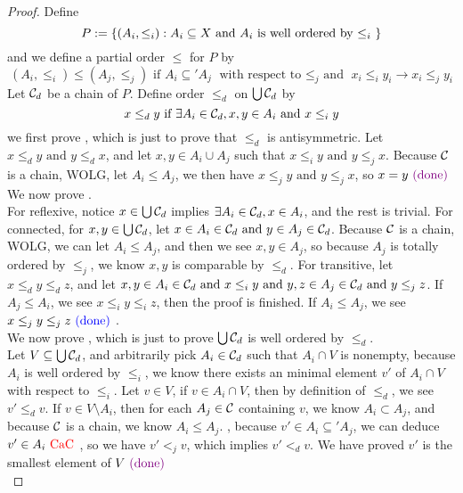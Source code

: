 \documentclass{report}
\begin{document}
\begin{proof}
Define
\begin{equation}
P:=\{ (A_i,\leq_i): A_i\subseteq X\text{ and }A_i\text{ is well ordered by $\leq_i$ } \}
\end{equation}
and we define a partial order $\leq $ for $P$ by
\begin{equation}
  (A_i,\leq_i)\leq (A_j,\leq _j)\text{ if }A_i\subseteq' A_j\text{ with respect to $\leq_j$ and }x_i\leq_i y_i\longrightarrow x_i\leq_j y_i 
\end{equation}
Let $\mathcal{C}_d$ be a chain of $P$. Define order $\leq_d$ on $\bigcup \mathcal{C}_d$ by
\begin{equation}
x\leq_d y\text{ if }\exists A_i\in\mathcal{C}_d, x,y\in A_i\text{ and }x\leq_i y
\end{equation}
we first prove , which is just to prove that $\leq_d$ is antisymmetric. Let $x\leq_d y\text{ and }y\leq _dx$, and let $x,y\in A_i\cup A_j$ such that $x\leq_i y\text{ and }y\leq _jx$. Because $\mathcal{C}$ is a chain, WOLG, let $A_i\leq A_j$, we then have  $x\leq_j y\text{ and }y\leq _jx$, so $x=y\textcolor{violet}{\text{ (done) }}$\\

We now prove  .\\

For reflexive, notice $x\in \bigcup\mathcal{C}_d$ implies $\exists A_i\in\mathcal{C}_d, x \in A_i$, and the rest is trivial. For connected, for $x,y\in \bigcup \mathcal{C}_d$, let $x\in A_i \in\mathcal{C}_d\text{ and }y\in A_j\in\mathcal{C}_d$. Because $\mathcal{C}$ is a chain, WOLG, we can let $A_i\leq A_j$, and then we see $x,y\in A_j$, so because $A_j$ is totally ordered by $\leq_j$, we know $x,y$ is comparable by  $\leq_d$. For transitive, let $x\leq_d y\leq _d z$, and let $x,y\in A_i\in\mathcal{C}_d\text{ and }x\leq _iy\text{ and }y,z\in A_j\in\mathcal{C}_d\text{ and }y\leq _jz$. If $A_j\leq A_i$, we see $x\leq_i y\leq_i z$, then the proof is finished. If $A_i\leq A_j$, we see $x\leq_j y\leq_j z\textcolor{blue}{\text{ (done) }}$.\\

We now prove , which is just to prove $\bigcup \mathcal{C}_d$ is well ordered by $\leq_d$.\\

Let $V\subseteq \bigcup \mathcal{C}_d$, and arbitrarily pick $A_i\in \mathcal{C}_d$ such that $A_i\cap V$ is nonempty, because $A_i$ is well ordered by  $\leq _i$, we know there exists an minimal element $v'$ of $A_i\cap V$ with respect to $\leq _i$. Let $v \in V$, if $v\in A_i\cap V$, then by definition of $\leq _d$, we see $v'\leq_d v$. If $v\in V\setminus A_i$, then for each $A_j\in\mathcal{C}$ containing $v$, we know $A_i\subset A_j$, and because $\mathcal{C}$ is a chain, we know $A_i\leq A_j$. , because $v'\in A_i\subseteq' A_j$, we can deduce $v'\in A_i\text{ \textcolor{red}{CaC} }$, so we have $v'<_j v$, which implies $v' <_d v$. We have proved $v'$ is the smallest element of $V\textcolor{violet}{\text{ (done) }}$ \\


\end{proof}
\end{document}

